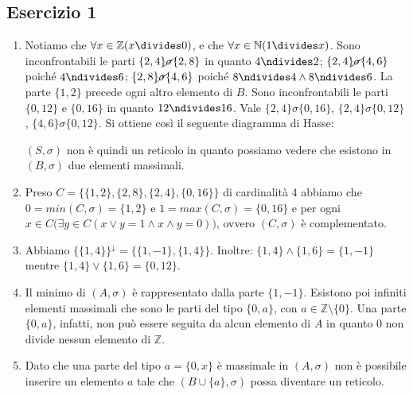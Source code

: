 \subsection*{Esercizio 1}
\begin{enumerate}[label=(\textit{\roman*})]
	\item Notiamo che $\forall x \in \mathbb{Z}(x \divides 0)$, e che $\forall x \in \mathbb{N}(1 \divides x)$. Sono inconfrontabili le parti $\{2,4\} \cancel{\sigma} \{2,8\}$ in quanto $4 \ndivides 2$; $\{2,4\} \cancel{\sigma} \{4,6\}$ poiché $4 \ndivides 6$; $\{2,8\} \cancel{\sigma} \{4,6\}$ poiché $8 \ndivides 4 \land 8 \ndivides 6$. La parte $\{1,2\}$ precede ogni altro elemento di $B$. Sono inconfrontabili le parti $\{0,12\}$ e $\{0,16\}$ in quanto $12 \ndivides 16$. Vale $\{2,4\} \sigma \{0,16\}$, $\{2,4\} \sigma \{0,12\}$, $\{4,6\} \sigma \{0,12\}$. Si ottiene così il seguente diagramma di Hasse:
	\begin{center}
	\end{center}
	$(S,\sigma)$ non è quindi un reticolo in quanto possiamo vedere che esistono in $(B,\sigma)$ due elementi massimali.
	\item Preso $C=\{\{1,2\},\{2,8\},\{2,4\},\{0,16\}\}$ di cardinalità 4 abbiamo che $0 = min(C,\sigma) = \{1,2\}$ e $1 = max(C,\sigma) = \{0,16\}$ e per ogni $x \in C \bigl(\exists y \in C (x \vee y = 1 \land x \wedge y = 0)\bigr)$, ovvero $(C,\sigma)$ è complementato.
	\item Abbiamo $\{\{1,4\}\}^{\downarrow} = \{\{1,-1\},\{1,4\}\}$. Inoltre: $\{1,4\} \wedge \{1,6\}=\{1,-1\}$ mentre $\{1,4\} \vee \{1,6\} = \{0,12\}$.
	\item Il minimo di $(A,\sigma)$ è rappresentato dalla parte $\{1,-1\}$. Esistono poi infiniti elementi massimali che sono le parti del tipo $\{0,a\}$, con $a \in \mathbb{Z}\setminus\{0\}$. Una parte $\{0,a\}$, infatti, non può essere seguita da alcun elemento di $A$ in quanto 0 non divide nessun elemento di $\mathbb{Z}$.
	\item Dato che una parte del tipo $a=\{0,x\}$ è massimale in $(A,\sigma)$ non è possibile inserire un elemento $a$ tale che $(B \cup \{a\},\sigma)$ possa diventare un reticolo.
\end{enumerate}

